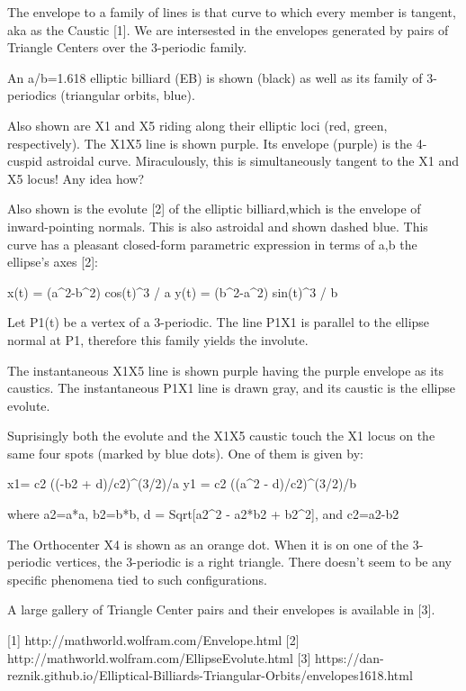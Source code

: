 The envelope to a family of lines is that curve to which every member is tangent, aka as the Caustic [1]. We are intersested in the envelopes generated by pairs of Triangle Centers over the 3-periodic family.

An a/b=1.618 elliptic billiard (EB) is shown (black) as well as its family of 3-periodics (triangular orbits, blue).

Also shown are X1 and X5 riding along their elliptic loci (red, green, respectively). The X1X5 line is shown purple. Its envelope (purple) is the 4-cuspid astroidal curve. Miraculously, this is simultaneously tangent to the X1 and X5 locus! Any idea how?

Also shown is the evolute [2] of the elliptic billiard,which is the envelope of inward-pointing normals. This is also astroidal and shown dashed blue.  This curve has a pleasant closed-form parametric expression in terms of a,b the ellipse's axes [2]:

x(t) = (a^2-b^2) cos(t)^3 / a
y(t) = (b^2-a^2) sin(t)^3 / b

Let P1(t) be a vertex of a 3-periodic. The line P1X1 is parallel to the ellipse normal at P1, therefore this family yields the involute.

The instantaneous X1X5 line is shown purple having the purple envelope as its caustics. The instantaneous P1X1 line is drawn gray, and its caustic is the ellipse evolute.

Suprisingly both the evolute and the X1X5 caustic touch the X1 locus on the same four spots (marked by blue dots). One of them is given by:

x1= c2 ((-b2 + d)/c2)^(3/2)/a
y1 = c2 ((a^2 - d)/c2)^(3/2)/b

where  a2=a*a, b2=b*b, d = Sqrt[a2^2 - a2*b2 + b2^2], and c2=a2-b2

The Orthocenter X4 is shown as an orange dot. When it is on one of the 3-periodic vertices, the 3-periodic is a right triangle. There doesn't seem to be any specific phenomena tied to such configurations.

A large gallery of Triangle Center pairs and their envelopes is available in [3].

[1] http://mathworld.wolfram.com/Envelope.html
[2] http://mathworld.wolfram.com/EllipseEvolute.html
[3] https://dan-reznik.github.io/Elliptical-Billiards-Triangular-Orbits/envelopes1618.html